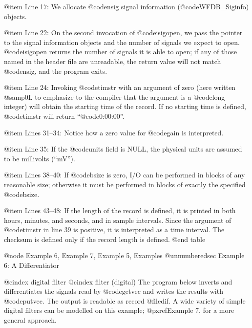 {{{{{{{{{{{{{{@item Line 17:
We allocate @code{nsig} signal information (@code{WFDB_Siginfo}) objects.

@item Line 22:
On the second invocation of @code{isigopen}, we pass the pointer to the
signal information objects and the number of signals we expect to open.
@code{isigopen} returns the number of signals it is able to open;  if
any of those named in the header file are unreadable, the return value
will not match @code{nsig}, and the program exits.

@item Line 24:
Invoking @code{timstr} with an argument of zero (here written @samp{0L}
to emphasize to the compiler that the argument is a @code{long} integer)
will obtain the starting time of the record.  If no starting time is
defined, @code{timstr} will return ``@code{0:00:00}''.

@item Lines 31--34:
Notice how a zero value for @code{gain} is interpreted.

@item Line 35:
If the @code{units} field is NULL, the physical units are assumed to be
millivolts (``mV'').

@item Lines 38--40:
If @code{bsize} is zero, I/O can be performed in blocks of any reasonable
size;  otherwise it must be performed in blocks of exactly the specified
@code{bsize}.

@item Lines 43--48:
If the length of the record is defined, it is printed in both hours,
minutes, and seconds, and in sample intervals.  Since the argument of
@code{timstr} in line 39 is positive, it is interpreted as a time
interval.  The checksum is defined only if the record length is
defined.
@end table

@node     Example 6, Example 7, Example 5, Examples
@unnumberedsec Example 6: A Differentiator

@cindex digital filter
@cindex filter (digital)
The program below inverts and differentiates the signals read by
@code{getvec} and writes the results with @code{putvec}.  The output is
readable as record @file{dif}.  A wide variety of simple digital filters
can be modelled on this example; @pxref{Example 7}, for a more general
approach.

}}}}}}}}}}}}}}
